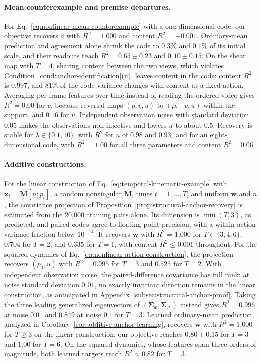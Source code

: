 \paragraph{Mean counterexample and premise departures.}
For Eq.~\ref{eq:nonlinear-mean-counterexample} with a one-dimensional code,
our objective recovers $a$ with $R^2=1.000$ and content $R^2=-0.001$.
Ordinary-mean prediction and agreement alone shrink the code to $0.3\%$
and $0.1\%$ of its initial scale, and their readouts reach
$R^2=0.65\pm0.23$ and $0.10\pm0.15$. On the shear map with $T=4$, sharing
content between the two views, which violates
Condition~\ref{cond:anchor-identification}(ii), leaves content in the code:
content $R^2$ is $0.997$, and $81\%$ of the code variance changes with
content at a fixed action. Averaging per-frame features over time instead
of reading the ordered video gives $R^2=0.00$ for $v$, because reversal maps
$(p,v,u)$ to $(p,-v,u)$ within the support, and $0.16$ for $u$.
Independent observation noise with standard deviation $0.05$ makes the
observations non-injective and lowers $u$ to about $0.5$. Recovery is stable
for $\lambda\in\{0.1,10\}$, with $R^2$ for $u$ of $0.98$ and $0.93$, and
for an eight-dimensional code, with $R^2=1.00$ for all three parameters and
content $R^2=0.06$.

\paragraph{Additive constructions.}
For the linear construction of Eq.~\ref{eq:temporal-kinematic-example}
with $\mathbf x_t=\mathbf M[n;p_t]$, a random nonsingular $\mathbf M$,
times $t=1,\ldots,T$, and uniform $\mathbf w$ and $n$, the covariance
projection of Proposition~\ref{prop:structural-anchor-recovery} is
estimated from the 20{,}000 training pairs alone. Its dimension is
$\min(T,3)$, as predicted, and paired codes agree to floating-point
precision, with a within-action variance fraction below $10^{-14}$.
It recovers $\mathbf w$ with $R^2=1.000$ for $T\in\{3,4,6\}$, $0.704$ for
$T=2$, and $0.335$ for $T=1$, with content $R^2\leq0.001$ throughout.
For the squared dynamics of Eq.~\ref{eq:nonlinear-action-construction},
the projection recovers $(p_0,u)$ with $R^2=0.995$ for $T=3$ and $0.525$
for $T=2$. With independent observation noise, the paired-difference
covariance has full rank: at noise standard deviation $0.01$, no exactly
invariant direction remains in the linear construction, as anticipated in
Appendix~\ref{subsec:structural-anchor-proof}. Taking the three leading
generalized eigenvectors of $(\boldsymbol\Sigma_\Phi,\boldsymbol\Sigma_\Delta)$
instead gives $R^2=0.996$ at noise $0.01$ and $0.849$ at noise $0.1$ for
$T=3$. Learned ordinary-mean prediction, analyzed in
Corollary~\ref{cor:additive-anchor-learning}, recovers $\mathbf w$ with
$R^2=1.000$ for $T\geq3$ on the linear construction; our objective reaches
$0.80\pm0.15$ for $T=3$ and $1.00$ for $T=6$. On the squared dynamics,
whose features span three orders of magnitude, both learned targets reach
$R^2\approx0.82$ for $T=3$.

